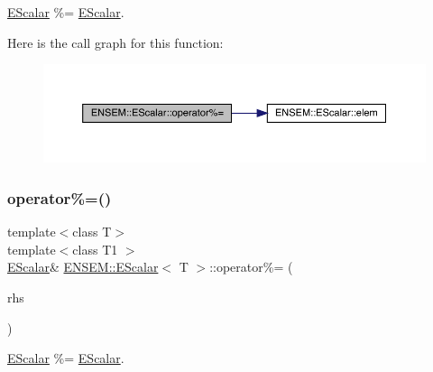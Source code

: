 \mbox{\hyperlink{classENSEM_1_1EScalar}{E\+Scalar}} \%= \mbox{\hyperlink{classENSEM_1_1EScalar}{E\+Scalar}}. 

Here is the call graph for this function\+:
\nopagebreak
\begin{figure}[H]
\begin{center}
\leavevmode
\includegraphics[width=350pt]{d0/d82/classENSEM_1_1EScalar_ab4bd572c2f331fadf6914f406bce991f_cgraph}
\end{center}
\end{figure}
\mbox{\label{classENSEM_1_1EScalar_ab4bd572c2f331fadf6914f406bce991f}} 
\subsubsection{\texorpdfstring{operator\%=()}{operator\%=()}\hspace{0.1cm}{\footnotesize\ttfamily [3/3]}}
{\footnotesize\ttfamily template$<$class T$>$ \\
template$<$class T1 $>$ \\
\mbox{\hyperlink{classENSEM_1_1EScalar}{E\+Scalar}}\& \mbox{\hyperlink{classENSEM_1_1EScalar}{E\+N\+S\+E\+M\+::\+E\+Scalar}}$<$ T $>$\+::operator\%= (\begin{DoxyParamCaption}\item[{const \mbox{\hyperlink{classENSEM_1_1EScalar}{E\+Scalar}}$<$ T1 $>$ \&}]{rhs }\end{DoxyParamCaption})\hspace{0.3cm}{\ttfamily [inline]}}



\mbox{\hyperlink{classENSEM_1_1EScalar}{E\+Scalar}} \%= \mbox{\hyperlink{classENSEM_1_1EScalar}{E\+Scalar}}. 


